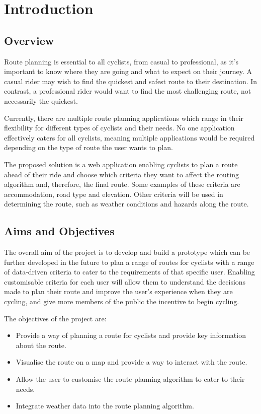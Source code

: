 \chapter{Introduction}
\label{chap:intro}

\section{Overview}
\label{intro:overview}

Route planning is essential to all cyclists, from casual to professional, as it's important to know where they are going and what to expect on their journey. A casual rider may wish to find the quickest and safest route to their destination. In contrast, a professional rider would want to find the most challenging route, not necessarily the quickest.

Currently, there are multiple route planning applications which range in their flexibility for different types of cyclists and their needs. No one application effectively caters for all cyclists, meaning multiple applications would be required depending on the type of route the user wants to plan.

The proposed solution is a web application enabling cyclists to plan a route ahead of their ride and choose which criteria they want to affect the routing algorithm and, therefore, the final route. Some examples of these criteria are accommodation, road type and elevation. Other criteria will be used in determining the route, such as weather conditions and hazards along the route.

\section{Aims and Objectives}
\label{intro:aimsandobjectives}

The overall aim of the project is to develop and build a prototype which can be further developed in the future to plan a range of routes for cyclists with a range of data-driven criteria to cater to the requirements of that specific user. Enabling customisable criteria for each user will allow them to understand the decisions made to plan their route and improve the user's experience when they are cycling, and give more members of the public the incentive to begin cycling.

The objectives of the project are:
\begin{itemize}
    \item Provide a way of planning a route for cyclists and provide key information about the route.
    \item Visualise the route on a map and provide a way to interact with the route.
    \item Allow the user to customise the route planning algorithm to cater to their needs.
    \item Integrate weather data into the route planning algorithm.
\end{itemize}

